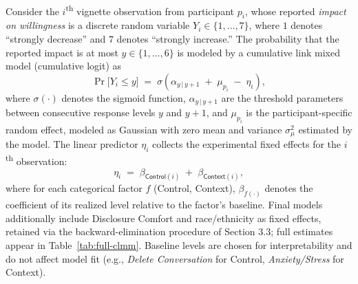 \documentclass[letterpaper,twocolumn,10pt]{article}
\begin{document}
Consider the $i$\textsuperscript{th} vignette observation from participant $p_i$, whose reported \emph{impact on willingness} is a discrete random variable $Y_i \in \{1,\dots,7\}$, where $1$ denotes ``strongly decrease'' and $7$ denotes ``strongly increase.'' The probability that the reported impact is at most $y \in \{1,\dots,6\}$ is modeled by a cumulative link mixed model (cumulative logit) as
\begin{equation}
\Pr\!\big[Y_i \le y\big] \;=\; \sigma\!\left(\alpha_{y\,|\,y+1} \;+\; \mu_{p_i} \;-\; \eta_i\right),
\label{eq:clmm-cdf}
\end{equation}
where $\sigma(\cdot)$ denotes the sigmoid function, $\alpha_{y\,|\,y+1}$ are the threshold parameters between consecutive response levels $y$ and $y{+}1$, and $\mu_{p_i}$ is the participant-specific random effect, modeled as Gaussian with zero mean and variance $\sigma_\mu^2$ estimated by the model. The linear predictor $\eta_i$ collects the experimental fixed effects for the $i$\textsuperscript{th} observation:
\begin{equation}
\label{eq:eta}
\eta_i \;=\; \beta_{\textsf{Control}(i)} \;+\; \beta_{\textsf{Context}(i)},
\end{equation}
where for each categorical factor $f$ (Control, Context), $\beta_{f(\cdot)}$ denotes the coefficient of its realized level relative to the factor's baseline. Final models additionally include Disclosure Comfort and race/ethnicity as fixed effects, retained via the backward-elimination procedure of Section 3.3; full estimates appear in Table~\ref{tab:full-clmm}. Baseline levels are chosen for interpretability and do not affect model fit (e.g., \emph{Delete Conversation} for Control, \emph{Anxiety/Stress} for Context).
\end{document}
